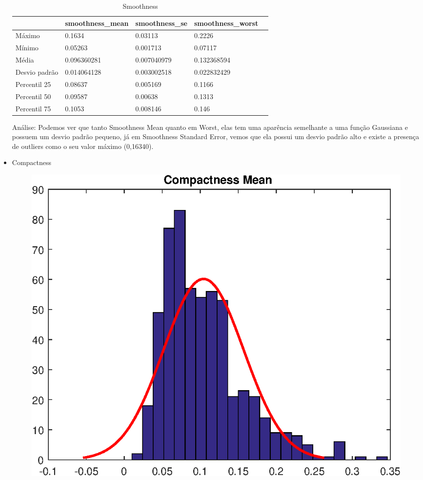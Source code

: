 \documentclass[11pt,a4paper]{article}
\numberwithin{equation}{section}
\begin{document}
\begin{itemize}
\begin{table}[H]
\centering
\caption{Smoothness}
\label{my-label}
\begin{tabular}{lllll} \hline
              & smoothness\_mean & smoothness\_se & smoothness\_worst &  \\ \hline
Máximo        & 0.1634           & 0.03113        & 0.2226            &  \\
Mínimo        & 0.05263          & 0.001713       & 0.07117           &  \\
Média         & 0.096360281      & 0.007040979    & 0.132368594       &  \\
Desvio padrão & 0.014064128      & 0.003002518    & 0.022832429       &  \\
Percentil 25  & 0.08637          & 0.005169       & 0.1166            &  \\
Percentil 50  & 0.09587          & 0.00638        & 0.1313            &  \\
Percentil 75  & 0.1053           & 0.008146       & 0.146             & \\ \hline
\end{tabular}
\end{table}

Análise: Podemos ver que tanto Smoothness Mean quanto em Worst, elas tem uma aparência semelhante a uma função Gaussiana e possuem um desvio padrão pequeno, já em Smoothness Standard Error, vemos que ela possui um desvio padrão alto e existe a presença de outliers como o seu valor máximo (0,16340).


\item Compactness
\begin{figure}[H]
\centering
  \includegraphics[width=.4\linewidth]{./img/compactness_mean}
  \label{fig:test1}
\end{figure}%



\end{itemize}
\end{document}

